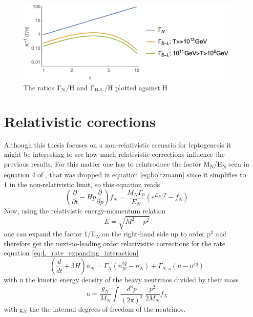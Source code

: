 \begin{figure}[H]
	\centering
	\includegraphics[width=0.8\linewidth]{Images/rates}
	\caption{The ratios $\Gamma\textsubscript{N}$/H and $\Gamma\textsubscript{B-L}$/H plotted against H}
	\label{fig:rates}
\end{figure}
\section{Relativistic corections}
Although this thesis focuses on a non-relativistic scenario for leptogenesis it might be interesting to see how much relativistic corrections influence the previous results. For this matter one has to reintroduce the factor M\textsubscript{N}/E\textsubscript{N} seen in equation 4 of \cite{Bodeker:2013qaa}, that was dropped in equation \eqref{eq:boltzmann} since it simplifies to 1 in the non-relativistic limit, so this equation reads
\begin{equation}
	\left(\frac{\partial}{\partial t}-Hp\frac{\partial}{\partial p}\right)f_N=\frac{M_N\Gamma_0}{E_N}\left(e^{E_N/T}-f_N\right)
	\label{eq:boltzmann_2}
\end{equation}
Now, using the relativistic energy-momentum relation
\begin{equation}
	E=\sqrt{M^2+p^2}
	\label{eq:rel_energy_momentum}
\end{equation}
one can expand the factor 1/E$_N$ on the right-hand side up to order p$^2$ and therefore get the next-to-leading order relativisitic corrections for the rate equation \eqref{eq:L_rate_expanding_interaction}
\begin{equation}
\left(\frac{d}{dt}+3H\right)n_N=\Gamma_N\left(n_N^{eq}-n_N\right)+\Gamma_{N,u}\left(u-u^{eq}\right)
\label{eq:L_rate_expanding_interaction_rel}
\end{equation}
with u the kinetic energy density of the heavy neutrinos divided by their mass
\begin{equation}
	u=\frac{g_N}{M_N}\int\frac{d^3p}{(2\pi)^3}\:\frac{p^2}{2M_N}f_N
	\label{eq:energy_density}
\end{equation}
with g$_N$ the the internal degrees of freedom of the neutrinos. \newline
